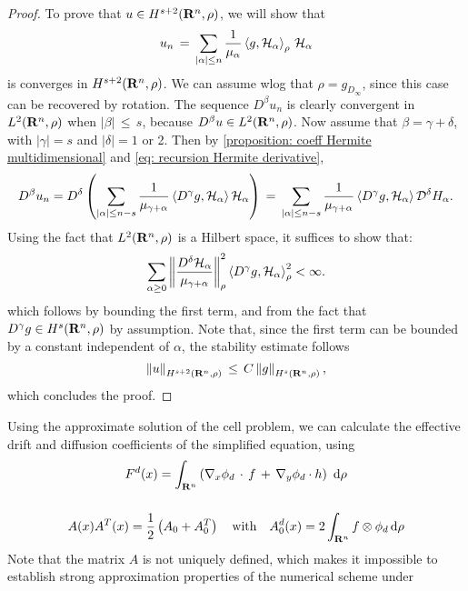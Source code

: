 \begin{proof}
    To prove that $u\in H^{s+2}(\mathbf R^n, \rho)$, we will show that 
    $$
        u_n \,=\, \sum_{|\alpha| \leq n} \frac{1}{\mu_\alpha} \left \langle g,\mathcal
            H_\alpha \right\rangle_\rho\, \mathcal H_\alpha
    $$
    is converges in $H^{s+2}(\mathbf R^n, \rho)$.
    We can assume wlog that $\rho = g_{D_\infty}$, since this case can be
    recovered by rotation.  The sequence $D^\beta u_n$ is clearly convergent in
    $L^{2}(\mathbf R^n,\rho)$ when $|\beta| \,\leq\, s$, because $D^\beta u \in
    L^{2}(\mathbf R^n,\rho)$. Now assume that $\beta=\gamma + \delta$, with
    $|\gamma| = s$ and $|\delta| = 1$ or 2. Then by \cref{proposition: coeff
        Hermite multidimensional} and \cref{eq: recursion Hermite derivative},
    $$
        D^\beta u_n =D^\delta \left(\sum_{|\alpha|\leq n-s}\frac{1}{\mu_{\gamma+ \alpha}}\left \langle D^\gamma g,\mathcal H_\alpha \right\rangle\mathcal  H_\alpha \right) \,=\, \sum_{|\alpha|\leq n-s}\frac{1}{\mu_{\gamma+ \alpha}}\left \langle D^\gamma g,\mathcal H_\alpha \right\rangle\mathcal  D^\delta H_\alpha. 
    $$
    Using the fact that $L^{2}(\mathbf R^n, \rho)$ is a Hilbert space, it
    suffices to show that: 
    $$
        \sum_{\alpha\geq 0}\left\| \frac{D^\delta \mathcal H_\alpha}{\mu_{\gamma+
                    \alpha}} \right\|_{\rho}^2 \left \langle D^\gamma g,\mathcal
            H_\alpha \right\rangle_{\rho}^2 < \infty.   
    $$
    which follows by bounding the first term, and from the fact that $D^\gamma
    g \in H^{s}(\mathbf R^n, \rho)$ by assumption. Note that, since the
    first term can be bounded by a constant independent of $\alpha$, the
    stability estimate follows
    $$
        \left\| u \right\|_{H^{s+2}(\mathbf R^n, \rho)} \,\leq\, C \left\| g \right\|_{H^{s}(\mathbf R^n, \rho)},
    $$
    which concludes the proof.
\end{proof} \fi
Using the approximate solution of the cell problem, we can calculate the
effective drift and diffusion coefficients of the simplified equation, using
\begin{equation}
    \begin{gathered}
        F^d (x) = \int_{\mathbf R^n} \left(\nabla_x \phi_d\,\cdot\,f\,+\,\nabla_y \phi_d \cdot h\right) \,\,\mathrm d \rho \\[0.5cm]
        A(x) A^T(x) = \frac{1}{2}\left(A_0 + A_0^T\right) \quad \text{with}\quad A_0^d (x) = 2 \int_{\mathbf R^n}  f \otimes \phi_d \,\mathrm d \rho
    \end{gathered}
    \label{eq: coefficients of approximate equation}
\end{equation}
Note that the matrix $A$ is not uniquely defined, which makes it impossible to
establish strong approximation properties of the numerical scheme under
